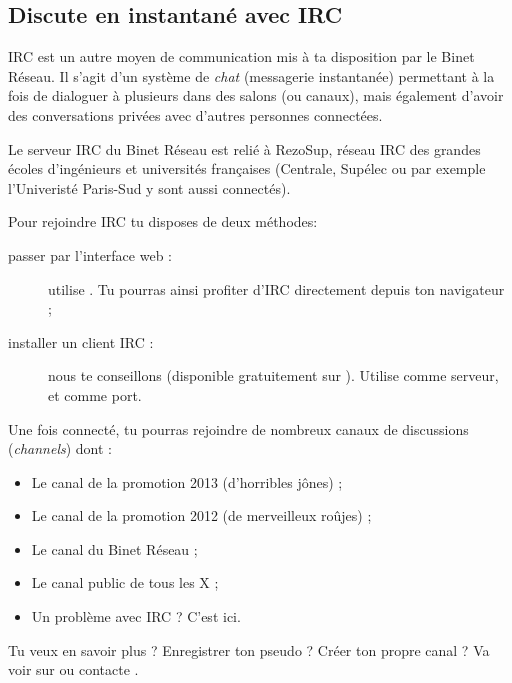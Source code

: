 %
\subsection{Discute en instantané avec IRC}

\label{irc}

IRC est un autre moyen de communication mis à ta disposition par le Binet Réseau.
Il s'agit d'un système de \emph{chat} (messagerie instantanée) permettant à la fois de dialoguer à plusieurs dans des salons (ou canaux),
mais également d'avoir des conversations privées avec d'autres personnes connectées.


Le serveur IRC du Binet Réseau est relié à RezoSup, réseau IRC des grandes écoles d'ingénieurs et universités françaises (Centrale, Supélec ou par exemple l'Univeristé Paris-Sud y sont aussi connectés).

Pour rejoindre IRC tu disposes de deux méthodes:

                  
\begin{description}
  \item[passer par l'interface web :] utilise . Tu pourras ainsi profiter d'IRC directement depuis ton navigateur ;
  \item[installer un client IRC :] nous te conseillons  (disponible gratuitement sur \linebreak {}). Utilise   comme serveur, et  comme port.
\end{description}

 
Une fois connecté, tu pourras rejoindre de nombreux canaux de discussions (\emph{channels}) dont :
\begin{itemize}
  \item {} Le canal de la promotion 2013 (d'horribles jônes) ;
   \item {} Le canal de la promotion 2012 (de merveilleux roûjes) ;
  \item {} Le canal du Binet Réseau ;
  \item {} Le canal public de tous les X ;
  \item {} Un problème avec IRC ? C'est ici.
\end{itemize}

 Tu veux en savoir plus ? Enregistrer ton pseudo ? Créer ton propre canal ? Va voir sur  ou contacte .


